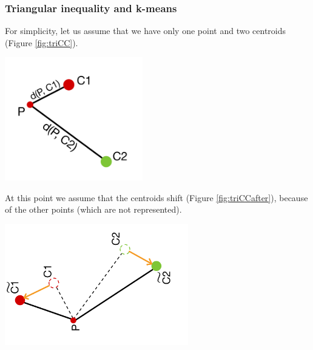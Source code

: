 \documentclass{report}
\begin{document}
\begin{minipage}[b]{0.48\textwidth}
  \subsubsection*{Triangular inequality and k-means}
  For simplicity, let us assume that we have only one point and two centroids (Figure \ref{fig:triCC}).  

  \begin{center}
      \includegraphics[width = 0.45\textwidth]{imgs/triCC.png}
      \label{fig:triCC}
  \end{center}

  At this point we assume that the centroids shift (Figure \ref{fig:triCCafter}), because of the other points (which are not represented).

  \begin{center}
      \includegraphics[width = 0.6\textwidth]{imgs/triCCAfter.png}
      \label{fig:triCCafter}
  \end{center}   
\end{minipage}
\hspace{0.1in}
\end{document}
